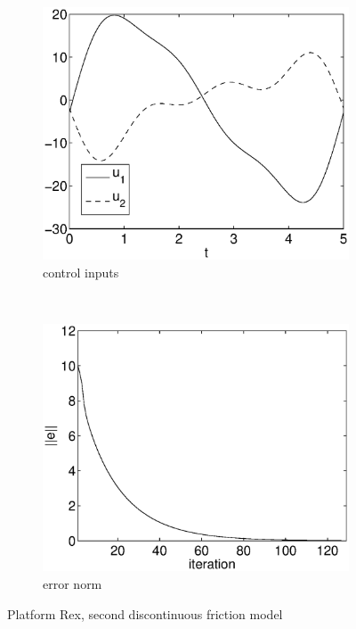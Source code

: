 \begin{figure}[h]
\begin{subfigure}[b]{0.45\textwidth}
\centering
\includegraphics[width=\textwidth]{img/discont_ok_u.eps}
\caption{control inputs}
\end{subfigure}
~
\begin{subfigure}[b]{0.45\textwidth}
\centering
\includegraphics[width=\textwidth]{img/discont_ok_err.eps}
\caption{error norm}
\end{subfigure}
\caption{Platform Rex, second discontinuous friction model}
\label{fig:pr_discont_ok}
\end{figure}
